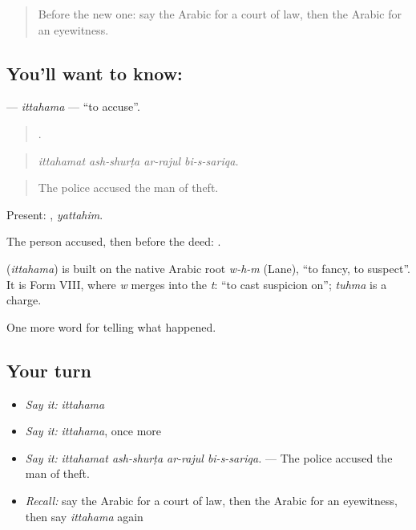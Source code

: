 \label{lesson:AR-C305-ittahama}



\begin{quote}
Before the new one: say the Arabic for a court of law, then the Arabic for an eyewitness.
\end{quote}

\subsection*{You'll want to know: }
\textbf{} — \emph{ittahama} — \textquotedblleft{}to accuse\textquotedblright{}.

\begin{quote}
   .
\end{quote}

\begin{quote}
\emph{ittahamat ash-shurṭa ar-rajul bi-s-sariqa.}
\end{quote}

\begin{quote}
The police accused the man of theft.
\end{quote}

Present: , \emph{yattahim}.

The person accused, then  before the deed:  .

\begin{cousinweb}
\textbf{} (\emph{ittahama}) is built on the native Arabic root \emph{w-h-m} (Lane), \textquotedblleft{}to fancy, to suspect\textquotedblright{}. It is Form VIII, where \emph{w} merges into the \emph{t}: \textquotedblleft{}to cast suspicion on\textquotedblright{}; \emph{tuhma} is a charge.
\end{cousinweb}

\begin{grammarlens}[title={What you've built}]
One more word for telling what happened.
\end{grammarlens}

\subsection*{Your turn}
\begin{itemize}
\raggedright
  \item \emph{Say it:} \emph{ittahama}
  \item \emph{Say it:} \emph{ittahama}, once more
  \item \emph{Say it:} \emph{ittahamat ash-shurṭa ar-rajul bi-s-sariqa.} — The police accused the man of theft.
  \item \emph{Recall:} say the Arabic for a court of law, then the Arabic for an eyewitness, then say \emph{ittahama} again
\end{itemize}

